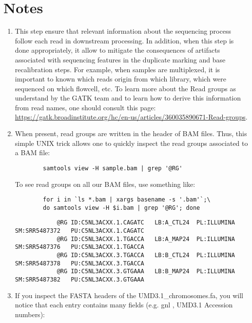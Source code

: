 \section{Notes}

\begin{enumerate}
	\item This step ensure that relevant information about the sequencing process follow each read in downstream processing. In addition, when this step is done appropriately, it allow to mitigate the consequences of artifacts associated with sequencing features in the duplicate marking and base recalibration steps. For example, when samples are multiplexed, it is important to known which reads origin from which library, which were sequenced on which flowcell, etc. To learn more about the Read groups as understand by the GATK team and to learn how to derive this information from read names, one should consult this page: \href{https://gatk.broadinstitute.org/hc/en-us/articles/360035890671-Read-groups}{https://gatk.broadinstitute.org/hc/en-us/articles/360035890671-Read-groups}.
	
	\item When present, read groups are written in the header of BAM files. Thus, this simple UNIX trick allows one to quickly inspect the read groups associated to a BAM file:
	
	\begin{verbatim}
		samtools view -H sample.bam | grep '@RG'	
	\end{verbatim}
	
	To see read groups on all our BAM files, use something like:
	
	\begin{verbatim}
		for i in `ls *.bam | xargs basename -s '.bam'`;\
		do samtools view -H $i.bam | grep '@RG'; done
	\end{verbatim}
	
	\begin{small}
		\begin{verbatim}
			@RG	ID:C5NL3ACXX.1.CAGATC	LB:A_CTL24	PL:ILLUMINA	SM:SRR5487372	PU:C5NL3ACXX.1.CAGATC
			@RG	ID:C5NL3ACXX.1.TGACCA	LB:A_MAP24	PL:ILLUMINA	SM:SRR5487376	PU:C5NL3ACXX.1.TGACCA
			@RG	ID:C5NL3ACXX.3.TGACCA	LB:B_CTL24	PL:ILLUMINA	SM:SRR5487378	PU:C5NL3ACXX.3.TGACCA
			@RG	ID:C5NL3ACXX.3.GTGAAA	LB:B_MAP24	PL:ILLUMINA	SM:SRR5487382	PU:C5NL3ACXX.3.GTGAAA
		\end{verbatim}
	\end{small}
	
	\item  If you inspect the FASTA headers of the UMD3.1\_chromosomes.fa, you will notice that each entry contains many fields (e.g. gnl , UMD3.1 Accession numbers):
	

\end{enumerate}
